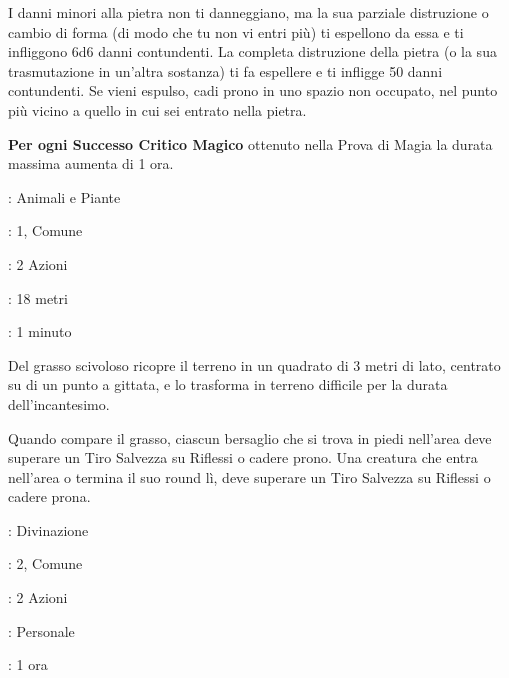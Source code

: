 \begin{multicols}{2}
I danni minori alla pietra non ti danneggiano, ma la sua parziale distruzione o cambio di forma (di modo che tu non vi entri più) ti espellono da essa e ti infliggono 6d6 danni contundenti. La completa distruzione della pietra (o la sua trasmutazione in un'altra sostanza) ti fa espellere e ti infligge 50 danni contundenti. Se vieni espulso, cadi prono in uno spazio non occupato, nel punto più vicino a quello in cui sei entrato nella pietra.

\textbf{Per ogni Successo Critico Magico} ottenuto nella Prova di Magia la durata massima aumenta di 1 ora.

\noindent\colorbox{OBSSgold!10}{
\begin{minipage}{0.95\linewidth}
\begin{description}[noitemsep, topsep=0pt, parsep=0pt, partopsep=0pt, leftmargin=0cm, labelwidth=1.3cm]
	\item[\textbf{Lista}]: Animali e Piante
	\item[\textbf{Livello}]: 1, Comune
	\item[\textbf{Lancio}]: 2 Azioni
	\item[\textbf{Gittata}]: 18 metri
	\item[\textbf{Durata}]: 1 minuto
\end{description}
\end{minipage}}\smallskip

Del grasso scivoloso ricopre il terreno in un quadrato di 3 metri di lato, centrato su di un punto a gittata, e lo trasforma in terreno difficile per la durata dell'incantesimo.

Quando compare il grasso, ciascun bersaglio che si trova in piedi nell'area deve superare un Tiro Salvezza su Riflessi o cadere prono. Una creatura che entra nell'area o termina il suo round lì, deve superare un Tiro Salvezza su Riflessi o cadere prona.

\noindent\colorbox{OBSSgold!10}{
\begin{minipage}{0.95\linewidth}
\begin{description}[noitemsep, topsep=0pt, parsep=0pt, partopsep=0pt, leftmargin=0cm, labelwidth=1.3cm]
	\item[\textbf{Lista}]: Divinazione
	\item[\textbf{Livello}]: 2, Comune
	\item[\textbf{Lancio}]: 2 Azioni
	\item[\textbf{Gittata}]: Personale
	\item[\textbf{Durata}]: 1 ora
\end{description}
\end{minipage}}\smallskip


\end{multicols}

